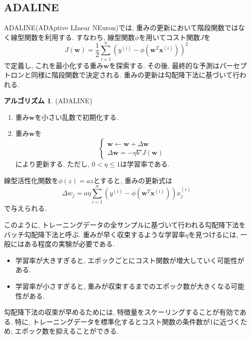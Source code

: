 \documentclass[uplatex]{jsarticle}
\theoremstyle{definition}
\newtheorem{algorithm}[definition]{アルゴリズム}
\numberwithin{equation}{section}
\begin{document}
\subsection{ADALINE}
ADALINE(ADAptive LInear NEuron)では, 重みの更新において階段関数ではなく線型関数を利用する.
すなわち, 線型関数$\phi$を用いてコスト関数$J$を
\begin{equation}
    J(\bm{w}) = \frac{1}{2}\sum_{i = 1}^{n}(y^{(i)} - \phi(\bm{w}^{T}\bm{x}^{(i)}))^{2}
\end{equation}
で定義し, これを最小化する重み$\bm{w}$を探索する.
その後, 最終的な予測はパーセプトロンと同様に階段関数で決定される.
重みの更新は勾配降下法に基づいて行われる.
\begin{algorithm}
    (ADALINE)
    \begin{enumerate}
        \item
        重み$\bm{w}$を小さい乱数で初期化する.
        \item
        重み$\bm{w}$を
        \begin{equation}
            \begin{cases}
                \bm{w} \leftarrow \bm{w} + \Delta\bm{w} \\
                \Delta\bm{w} = -\eta\nabla J(\bm{w})
            \end{cases}
        \end{equation}
        により更新する.
        ただし, $0 < \eta \leq 1$は学習率である.
    \end{enumerate}
\end{algorithm}
線型活性化関数を$\phi(z) = az$とすると, 重みの更新式は
\begin{equation}
    \Delta w_{j} = a\eta\sum_{i = 1}^{n} (y^{(i)} - \phi(\bm{w}^{T}\bm{x}^{(i)}))x^{(i)}_{j}
\end{equation}
で与えられる.

このように, トレーニングデータの全サンプルに基づいて行われる勾配降下法をバッチ勾配降下法と呼ぶ.
重みが早く収束するような学習率$\eta$を見つけるには, 一般にはある程度の実験が必要である.
\begin{itemize}
    \item
    学習率が大きすぎると, エポックごとにコスト関数が増大していく可能性がある.
    \item
    学習率が小さすぎると, 重みが収束するまでのエポック数が大きくなる可能性がある.
\end{itemize}

勾配降下法の収束が早めるためには, 特徴量をスケーリングすることが有効である.
特に, トレーニングデータを標準化するとコスト関数の条件数が1に近づくため, エポック数を抑えることができる.
\end{document}
